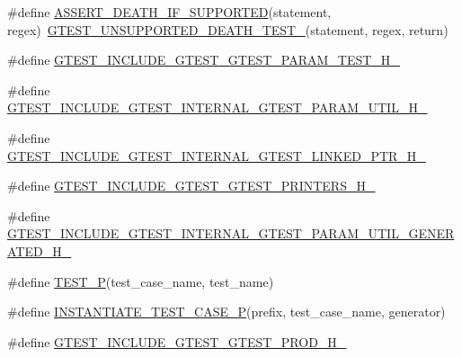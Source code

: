 \begin{DoxyCompactItemize}
\item 
\#define \hyperlink{fused-src_2gtest_2gtest_8h_ab2f0f25b46353767179a49ebd15b7345}{A\-S\-S\-E\-R\-T\-\_\-\-D\-E\-A\-T\-H\-\_\-\-I\-F\-\_\-\-S\-U\-P\-P\-O\-R\-T\-E\-D}(statement, regex)~\hyperlink{gtest-death-test-internal_8h_a29a145cda8bd2d0c6a78b0ac1d670d18}{G\-T\-E\-S\-T\-\_\-\-U\-N\-S\-U\-P\-P\-O\-R\-T\-E\-D\-\_\-\-D\-E\-A\-T\-H\-\_\-\-T\-E\-S\-T\-\_\-}(statement, regex, return)
\item 
\#define \hyperlink{fused-src_2gtest_2gtest_8h_a15b9e83e56cafef0ddd12e2444772908}{G\-T\-E\-S\-T\-\_\-\-I\-N\-C\-L\-U\-D\-E\-\_\-\-G\-T\-E\-S\-T\-\_\-\-G\-T\-E\-S\-T\-\_\-\-P\-A\-R\-A\-M\-\_\-\-T\-E\-S\-T\-\_\-\-H\-\_\-}
\item 
\#define \hyperlink{fused-src_2gtest_2gtest_8h_a83cf5c299fc04d9f8e555cb42a97aa47}{G\-T\-E\-S\-T\-\_\-\-I\-N\-C\-L\-U\-D\-E\-\_\-\-G\-T\-E\-S\-T\-\_\-\-I\-N\-T\-E\-R\-N\-A\-L\-\_\-\-G\-T\-E\-S\-T\-\_\-\-P\-A\-R\-A\-M\-\_\-\-U\-T\-I\-L\-\_\-\-H\-\_\-}
\item 
\#define \hyperlink{fused-src_2gtest_2gtest_8h_af3b61eb2eed4f1fdc94ed2e181fa8483}{G\-T\-E\-S\-T\-\_\-\-I\-N\-C\-L\-U\-D\-E\-\_\-\-G\-T\-E\-S\-T\-\_\-\-I\-N\-T\-E\-R\-N\-A\-L\-\_\-\-G\-T\-E\-S\-T\-\_\-\-L\-I\-N\-K\-E\-D\-\_\-\-P\-T\-R\-\_\-\-H\-\_\-}
\item 
\#define \hyperlink{fused-src_2gtest_2gtest_8h_a146e4a81159ecfdc33030e147a024346}{G\-T\-E\-S\-T\-\_\-\-I\-N\-C\-L\-U\-D\-E\-\_\-\-G\-T\-E\-S\-T\-\_\-\-G\-T\-E\-S\-T\-\_\-\-P\-R\-I\-N\-T\-E\-R\-S\-\_\-\-H\-\_\-}
\item 
\#define \hyperlink{fused-src_2gtest_2gtest_8h_a34b82ce6255f2f5666647d35498f4c65}{G\-T\-E\-S\-T\-\_\-\-I\-N\-C\-L\-U\-D\-E\-\_\-\-G\-T\-E\-S\-T\-\_\-\-I\-N\-T\-E\-R\-N\-A\-L\-\_\-\-G\-T\-E\-S\-T\-\_\-\-P\-A\-R\-A\-M\-\_\-\-U\-T\-I\-L\-\_\-\-G\-E\-N\-E\-R\-A\-T\-E\-D\-\_\-\-H\-\_\-}
\item 
\#define \hyperlink{fused-src_2gtest_2gtest_8h_abd3bb216dafbffa36044a6030216ecda}{T\-E\-S\-T\-\_\-\-P}(test\-\_\-case\-\_\-name, test\-\_\-name)
\item 
\#define \hyperlink{fused-src_2gtest_2gtest_8h_ae54c460d07e5e2020484a83764d5111b}{I\-N\-S\-T\-A\-N\-T\-I\-A\-T\-E\-\_\-\-T\-E\-S\-T\-\_\-\-C\-A\-S\-E\-\_\-\-P}(prefix, test\-\_\-case\-\_\-name, generator)
\item 
\#define \hyperlink{fused-src_2gtest_2gtest_8h_a61e419ca2f3cc78bbae47d074c5d4400}{G\-T\-E\-S\-T\-\_\-\-I\-N\-C\-L\-U\-D\-E\-\_\-\-G\-T\-E\-S\-T\-\_\-\-G\-T\-E\-S\-T\-\_\-\-P\-R\-O\-D\-\_\-\-H\-\_\-}
\item 

\end{DoxyCompactItemize}
